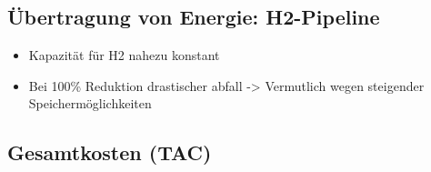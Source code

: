 \subsection{Übertragung von Energie: H2-Pipeline}
\begin{itemize}
  \item Kapazität für H2 nahezu konstant
  \item Bei 100\% Reduktion drastischer abfall -> Vermutlich wegen steigender Speichermöglichkeiten  
\end{itemize}

\subsection{Gesamtkosten (TAC)}





